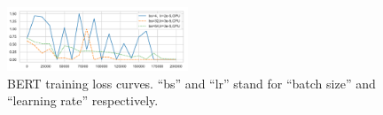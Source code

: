 \begin{figure}[!t]
\centering
\includegraphics[width=0.48\textwidth]{figures/output.pdf}
\vspace{-22pt}
\caption{\textcolor{check}{BERT training loss curves. ``bs'' and ``lr'' stand for ``batch size'' and  ``learning rate'' respectively.}}
\vspace{-3pt}
\label{fig:bert_motivation}
\end{figure}

